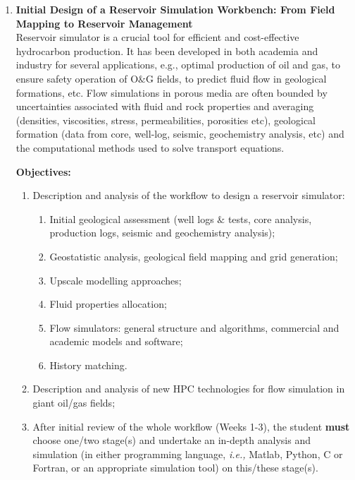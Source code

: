 \documentclass[12pts,a4paper,amsmath,amssymb,floatfix]{article}%
\newcommand{\ie}{{\it i.e., }}
\begin{document}

\begin{enumerate}[label=\bfseries Project: \arabic*:]


\item {\bf Initial Design of a Reservoir Simulation Workbench: From Field Mapping to Reservoir Management}\\
Reservoir simulator is a crucial tool for efficient and cost-effective hydrocarbon production. It has been developed in both academia and industry for several applications, e.g., optimal production of oil and gas, to ensure safety operation of O$\&$G fields, to predict fluid flow in geological formations, etc. Flow simulations in porous media are often bounded by uncertainties associated with fluid and rock properties and averaging (densities, viscosities, stress, permeabilities, porosities etc), geological formation (data from core, well-log, seismic, geochemistry analysis, etc) and the computational methods used to solve transport equations. 

\noindent
{\bf Objectives:}
\begin{enumerate}
\item Description and analysis of the workflow to design a reservoir simulator:
\begin{enumerate}
\item Initial geological assessment (well logs $\&$ tests, core analysis, production logs, seismic and geochemistry analysis);
\item Geostatistic analysis, geological field mapping and grid generation;
\item Upscale modelling approaches;
\item Fluid properties allocation;
\item Flow simulators: general structure and algorithms, commercial and academic models and software;
\item History matching.
\end{enumerate}
\item Description and analysis of new HPC technologies for flow simulation in giant oil/gas fields;
\item After initial review of the whole workflow (Weeks 1-3), the student {\bf must} choose one/two stage(s) and undertake an in-depth analysis and simulation (in either programming language, \ie Matlab, Python, C or Fortran, or an appropriate simulation tool) on this/these stage(s).
\end{enumerate}


\end{enumerate}
\end{document}
